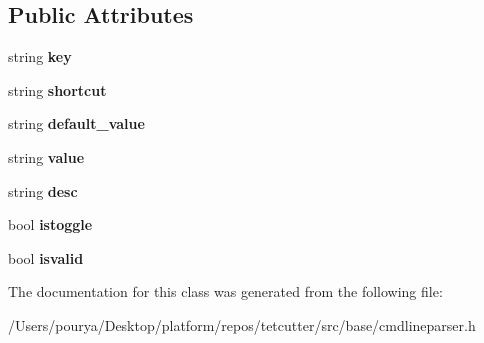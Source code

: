 \subsection*{Public Attributes}
\begin{DoxyCompactItemize}
\item 
\hypertarget{classps_1_1utils_1_1CmdLineParser_1_1CmdSwitch_a7699ec7daf9eacb532b8e8897c276ffc}{}string {\bfseries key}\label{classps_1_1utils_1_1CmdLineParser_1_1CmdSwitch_a7699ec7daf9eacb532b8e8897c276ffc}

\item 
\hypertarget{classps_1_1utils_1_1CmdLineParser_1_1CmdSwitch_ac97ba36cae224a21da7eed424439ad8a}{}string {\bfseries shortcut}\label{classps_1_1utils_1_1CmdLineParser_1_1CmdSwitch_ac97ba36cae224a21da7eed424439ad8a}

\item 
\hypertarget{classps_1_1utils_1_1CmdLineParser_1_1CmdSwitch_aab193ce5b2fa667c43b63ba47967430a}{}string {\bfseries default\+\_\+value}\label{classps_1_1utils_1_1CmdLineParser_1_1CmdSwitch_aab193ce5b2fa667c43b63ba47967430a}

\item 
\hypertarget{classps_1_1utils_1_1CmdLineParser_1_1CmdSwitch_a994fb96f31f902089e4995b3fcb30b67}{}string {\bfseries value}\label{classps_1_1utils_1_1CmdLineParser_1_1CmdSwitch_a994fb96f31f902089e4995b3fcb30b67}

\item 
\hypertarget{classps_1_1utils_1_1CmdLineParser_1_1CmdSwitch_a9be04c8c427e0f640a33795ded7986f2}{}string {\bfseries desc}\label{classps_1_1utils_1_1CmdLineParser_1_1CmdSwitch_a9be04c8c427e0f640a33795ded7986f2}

\item 
\hypertarget{classps_1_1utils_1_1CmdLineParser_1_1CmdSwitch_aae0efff071719d4eba1e3ef63b7d3063}{}bool {\bfseries istoggle}\label{classps_1_1utils_1_1CmdLineParser_1_1CmdSwitch_aae0efff071719d4eba1e3ef63b7d3063}

\item 
\hypertarget{classps_1_1utils_1_1CmdLineParser_1_1CmdSwitch_a01c1b146903579c92faff07d4624cdd1}{}bool {\bfseries isvalid}\label{classps_1_1utils_1_1CmdLineParser_1_1CmdSwitch_a01c1b146903579c92faff07d4624cdd1}

\end{DoxyCompactItemize}


The documentation for this class was generated from the following file\+:\begin{DoxyCompactItemize}
\item 
/\+Users/pourya/\+Desktop/platform/repos/tetcutter/src/base/cmdlineparser.\+h\end{DoxyCompactItemize}
